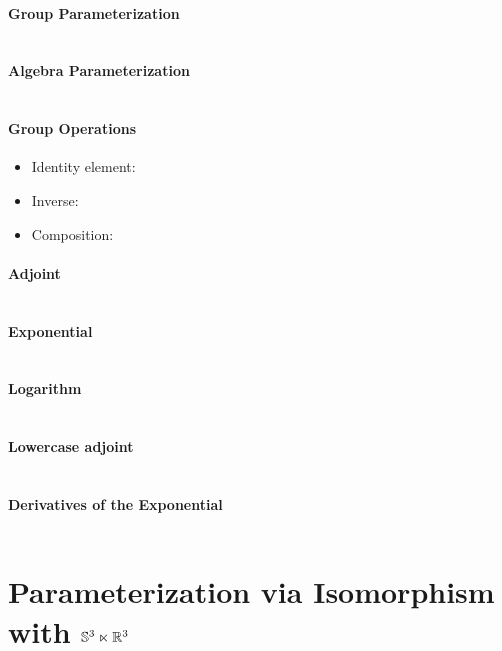 \begin{properties}[breakable, title={Formulas for $\SEthree$}]
\paragraph{Group Parameterization}
\begin{equation}
\end{equation}

\paragraph{Algebra Parameterization}
\begin{equation}
\end{equation}

\paragraph{Group Operations}
\begin{itemize}
  \item Identity element:
  \item Inverse:
  \item Composition:
\end{itemize}

\paragraph{Adjoint}
\begin{equation}
\end{equation}

\paragraph{Exponential}
\begin{equation}
\end{equation}

\paragraph{Logarithm}
\begin{equation}
\end{equation}

\paragraph{Lowercase adjoint}
\begin{equation}
\end{equation}

\paragraph{Derivatives of the Exponential}
\begin{equation}
\end{equation}
\end{properties}

\section{Parameterization via Isomorphism with \texorpdfstring{${\mathbb{S}^3} \ltimes \mathbb{R}^{3}$}{S3 |x R3}}

